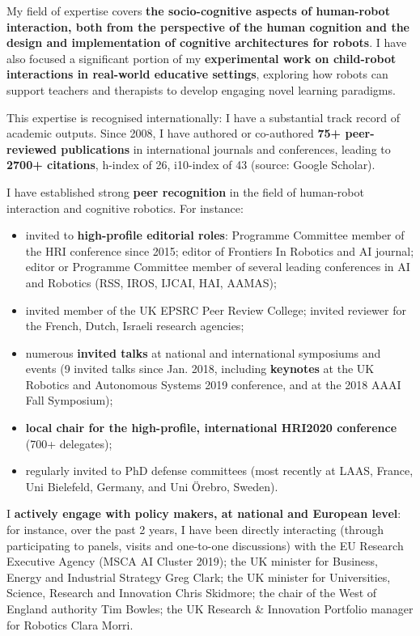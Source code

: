 My field of expertise covers \textbf{the socio-cognitive aspects of
human-robot interaction, both from the perspective of the human cognition and
the design and implementation of cognitive architectures for robots}. I have
also focused a significant portion of my \textbf{experimental work on
child-robot interactions in real-world educative settings}, exploring how robots
can support teachers and therapists to develop engaging novel
learning paradigms.

This expertise is recognised internationally: I have a substantial track record
of academic outputs. Since 2008, I have authored or co-authored \textbf{75+ peer-reviewed
publications} in international journals and conferences, leading to \textbf{2700+
citations}, h-index of 26, i10-index of 43 (source: Google Scholar).

I have established strong \textbf{peer recognition} in the field of human-robot interaction
and cognitive robotics. For instance:

\begin{itemize}[noitemsep,topsep=0pt,parsep=0pt,partopsep=0pt]
    \item invited to \textbf{high-profile editorial roles}: Programme Committee member of the HRI
conference since 2015; editor of Frontiers In Robotics and AI journal; editor or
Programme Committee member of several leading conferences in AI and Robotics
        (RSS, IROS, IJCAI, HAI, AAMAS);
    \item invited member of the UK EPSRC Peer Review College;
        invited reviewer for the French, Dutch, Israeli research agencies;
    \item numerous \textbf{invited talks} at national and international symposiums and
        events (9 invited talks since Jan. 2018, including \textbf{keynotes} at the UK Robotics
and Autonomous Systems 2019 conference, and at the 2018 AAAI Fall Symposium);
    \item \textbf{local chair for the high-profile, international HRI2020
        conference} (700+ delegates);
    \item regularly invited to PhD defense committees (most recently at
        LAAS, France, Uni Bielefeld, Germany, and Uni Örebro, Sweden).
\end{itemize}


\vspace{1em} 

I \textbf{actively engage with policy makers, at national and European
level}: for instance, over the past 2 years, I have been directly interacting
(through participating to panels, visits and one-to-one discussions) with the EU
Research Executive Agency (MSCA AI Cluster 2019); the UK minister for Business,
Energy and Industrial Strategy Greg Clark; the UK minister for Universities,
Science, Research and Innovation Chris Skidmore; the chair of the West of
England authority Tim Bowles; the UK Research \& Innovation Portfolio
manager for Robotics Clara Morri.

